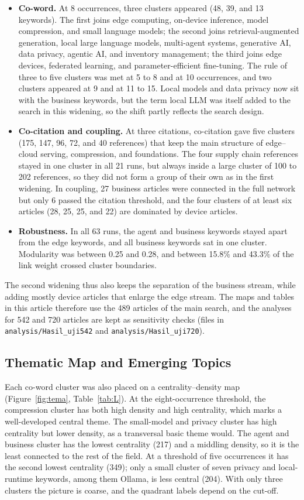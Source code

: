 \begin{itemize}
  \item \textbf{Co-word.} At 8 occurrences, three clusters appeared (48, 39, and 13 keywords). The first joins edge computing, on-device inference, model compression, and small language models; the second joins retrieval-augmented generation, local large language models, multi-agent systems, generative AI, data privacy, agentic AI, and inventory management; the third joins edge devices, federated learning, and parameter-efficient fine-tuning. The rule of three to five clusters was met at 5 to 8 and at 10 occurrences, and two clusters appeared at 9 and at 11 to 15. Local models and data privacy now sit with the business keywords, but the term local LLM was itself added to the search in this widening, so the shift partly reflects the search design.
  \item \textbf{Co-citation and coupling.} At three citations, co-citation gave five clusters (175, 147, 96, 72, and 40 references) that keep the main structure of edge--cloud serving, compression, and foundations. The four supply chain references stayed in one cluster in all 21 runs, but always inside a large cluster of 100 to 202 references, so they did not form a group of their own as in the first widening. In coupling, 27 business articles were connected in the full network but only 6 passed the citation threshold, and the four clusters of at least six articles (28, 25, 25, and 22) are dominated by device articles.
  \item \textbf{Robustness.} In all 63 runs, the agent and business keywords stayed apart from the edge keywords, and all business keywords sat in one cluster. Modularity was between 0.25 and 0.28, and between 15.8\% and 43.3\% of the link weight crossed cluster boundaries.
\end{itemize}
The second widening thus also keeps the separation of the business stream, while adding mostly device articles that enlarge the edge stream. The maps and tables in this article therefore use the 489 articles of the main search, and the analyses for 542 and 720 articles are kept as sensitivity checks (files in \texttt{analysis/Hasil\_uji542} and \texttt{analysis/Hasil\_uji720}).

\subsection{Thematic Map and Emerging Topics}
Each co-word cluster was also placed on a centrality--density map (Figure~\ref{fig:tema}, Table~\ref{tab:L}). At the eight-occurrence threshold, the compression cluster has both high density and high centrality, which marks a well-developed central theme. The small-model and privacy cluster has high centrality but lower density, as a transversal basic theme would. The agent and business cluster has the lowest centrality (217) and a middling density, so it is the least connected to the rest of the field. At a threshold of five occurrences it has the second lowest centrality (349); only a small cluster of seven privacy and local-runtime keywords, among them Ollama, is less central (204). With only three clusters the picture is coarse, and the quadrant labels depend on the cut-off.

